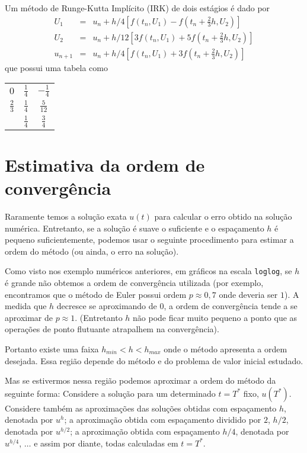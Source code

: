 \begin{ex}
Um método de Runge-Kutta Implícito (IRK) de dois estágios é dado por
\begin{eqnarray}
  U_1 &=&u_n  + h/4  [ f(t_n,U_1) - f(t_n+\frac{2}{3}h,U_2)]\\
  U_2 &=&u_n  + h/12 [3f(t_n,U_1) +5f(t_n+\frac{2}{3}h,U_2)]\\
  u_{n+1}&=&u_n  + h/4 [f(t_n,U_1) +3f(t_n+\frac{2}{3}h,U_2)]
\end{eqnarray}
que possui uma tabela como
\begin{center}
\begin{tabular}{c|cc}
  $0$ & $\frac{1}{4}$ &$-\frac{1}{4}$  \\
  $\frac{2}{3}$ & $\frac{1}{4}$ &$\frac{5}{12}$  \\  \hline
      & $\frac{1}{4}$ &$\frac{3}{4}$
\end{tabular}
\end{center}
\end{ex}




\section{Estimativa da ordem de convergência}

Raramente temos a solução exata $u(t)$ para calcular o erro obtido na solução numérica. Entretanto, se a solução é suave o suficiente e o espaçamento $h$ é pequeno suficientemente, podemos usar o seguinte procedimento para estimar a ordem do método (ou ainda, o erro na solução).

Como visto nos exemplo numéricos anteriores, em gráficos na escala \verb#loglog#, se $h$ é grande não obtemos a ordem de convergência utilizada (por exemplo, encontramos que o método de Euler possui ordem $p\approx 0,7$ onde deveria ser $1$). A medida que $h$ decresce se aproximando de $0$, a ordem de convergência tende a se aproximar de $p\approx 1$. (Entretanto $h$ não pode ficar muito pequeno a ponto que as operações de ponto flutuante atrapalhem na convergência).

Portanto existe uma faixa $h_{min} < h < h_{max}$ onde o método apresenta a ordem desejada. Essa região depende do método e do problema de valor inicial estudado.

Mas se estivermos nessa região podemos aproximar a ordem do método da seguinte forma: Considere a solução para um determinado $t=T^*$ fixo, $u(T^*)$. Considere também as aproximações das soluções obtidas com espaçamento $h$, denotada por $u^{h}$; a aproximação obtida com espaçamento dividido por $2$, $h/2$, denotada por $u^{h/2}$; a aproximação obtida com espaçamento $h/4$, denotada por $u^{h/4}$, $\ldots $ e assim por diante, todas calculadas em $t=T^*$.

